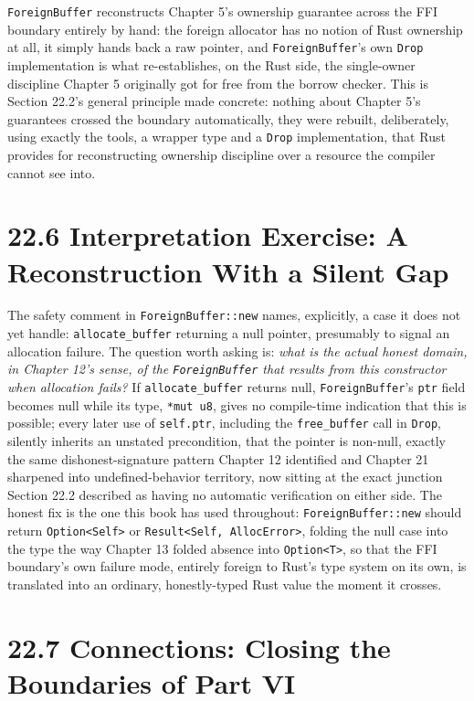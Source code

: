 \documentclass[11pt]{book}
\begin{document}
\texttt{ForeignBuffer} reconstructs Chapter 5's ownership guarantee across the FFI boundary entirely by hand: the foreign allocator has no notion of Rust ownership at all, it simply hands back a raw pointer, and \texttt{ForeignBuffer}'s own \texttt{Drop} implementation is what re-establishes, on the Rust side, the single-owner discipline Chapter 5 originally got for free from the borrow checker. This is Section 22.2's general principle made concrete: nothing about Chapter 5's guarantees crossed the boundary automatically, they were rebuilt, deliberately, using exactly the tools, a wrapper type and a \texttt{Drop} implementation, that Rust provides for reconstructing ownership discipline over a resource the compiler cannot see into.

\section*{22.6 Interpretation Exercise: A Reconstruction With a Silent Gap}

The safety comment in \texttt{ForeignBuffer::new} names, explicitly, a case it does not yet handle: \texttt{allocate\_buffer} returning a null pointer, presumably to signal an allocation failure. The question worth asking is: \emph{what is the actual honest domain, in Chapter 12's sense, of the \texttt{ForeignBuffer} that results from this constructor when allocation fails?} If \texttt{allocate\_buffer} returns null, \texttt{ForeignBuffer}'s \texttt{ptr} field becomes null while its type, \texttt{*mut u8}, gives no compile-time indication that this is possible; every later use of \texttt{self.ptr}, including the \texttt{free\_buffer} call in \texttt{Drop}, silently inherits an unstated precondition, that the pointer is non-null, exactly the same dishonest-signature pattern Chapter 12 identified and Chapter 21 sharpened into undefined-behavior territory, now sitting at the exact junction Section 22.2 described as having no automatic verification on either side. The honest fix is the one this book has used throughout: \texttt{ForeignBuffer::new} should return \texttt{Option<Self>} or \texttt{Result<Self, AllocError>}, folding the null case into the type the way Chapter 13 folded absence into \texttt{Option<T>}, so that the FFI boundary's own failure mode, entirely foreign to Rust's type system on its own, is translated into an ordinary, honestly-typed Rust value the moment it crosses.

\section*{22.7 Connections: Closing the Boundaries of Part VI}
\end{document}
